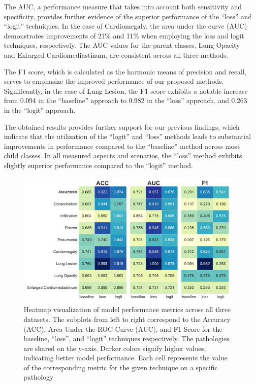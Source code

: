 \documentclass[review,1p,times,numbers]{elsarticle}
\begin{document}
The AUC, a performance measure that takes into account both sensitivity and specificity, provides further evidence of the superior performance of the ``loss'' and ``logit'' techniques. In the case of Cardiomegaly, the area under the curve (AUC) demonstrates improvements of 21\% and 11\% when employing the loss and logit techniques, respectively. The AUC values for the parent classes, Lung Opacity and Enlarged Cardiomediastinum, are consistent across all three methods.

The F1 score, which is calculated as the harmonic means of precision and recall, serves to emphasize the improved performance of our proposed methods. Significantly, in the case of Lung Lesion, the F1 score exhibits a notable increase from 0.094 in the ``baseline'' approach to 0.982 in the ``loss'' approach, and 0.263 in the ``logit'' approach.

The obtained results provides further support for our previous findings, which indicate that the utilization of the ``logit'' and ``loss'' methods leads to substantial improvements in performance compared to the ``baseline'' method across most child classes. In all measured aspects and scenarios, the ``loss'' method exhibits slightly superior performance compared to the ``logit'' method.

\begin{figure}[htbp]
    \centering
    \includegraphics[width=\textwidth]{figures/auc_acc_f1_all_datasets/ROC/metrics_AUC_ACC_F1.pdf}
    \caption[Heatmap Visualization of Model Performance Metrics (ACC, AUC, F1) for Different Techniques across Pathologies]{Heatmap visualization of model performance metrics across all three datasets. The subplots from left to right correspond to the Accuracy (ACC), Area Under the ROC Curve (AUC), and F1 Score for the baseline, ``loss'', and ``logit'' techniques respectively. The pathologies are shared on the y-axis. Darker colors signify higher values, indicating better model performance. Each cell represents the value of the corresponding metric for the given technique on a specific pathology}\label{fig:taxonomy.fig.2.metrics}
\end{figure}
\end{document}
